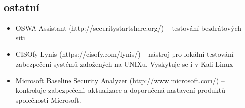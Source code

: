 \documentclass{article}
\begin{document}
\subsection{ostatní}
\begin{itemize}
    \item OSWA-Assistant (http://securitystartshere.org/) – testování bezdrátových
sítí
\item CISOfy Lynis (https://cisofy.com/lynis/) – nástroj pro lokální testování zabezpečení
systémů založených na UNIXu. Vyskytuje se i v Kali Linux
\item Microsoft Baseline Security Analyzer (http://www.microsoft.com/) – kontroluje
zabezpečení, aktualizace a doporučená nastavení produktů společnosti Microsoft.
\end{itemize}
\end{document}
